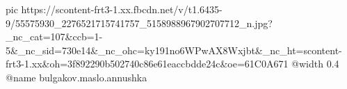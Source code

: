  
 
 
 
 

\ifcmt
  pic https://scontent-frt3-1.xx.fbcdn.net/v/t1.6435-9/55575930_2276521715741757_5158988967902707712_n.jpg?_nc_cat=107&ccb=1-5&_nc_sid=730e14&_nc_ohc=ky191no6WPwAX8Wxjbt&_nc_ht=scontent-frt3-1.xx&oh=3f892290b502740c86e61eaccbdde24c&oe=61C0A671
  @width 0.4
	@name bulgakov.maslo.annushka
\fi

